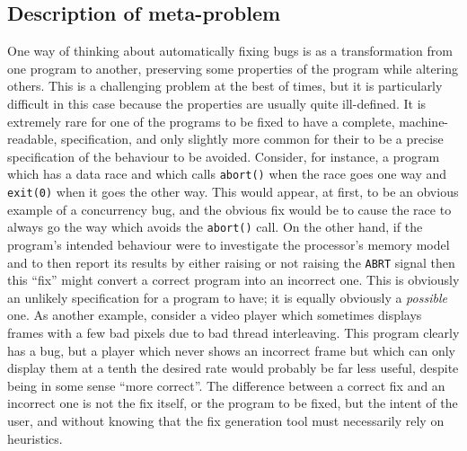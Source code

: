 \subsection{Description of meta-problem}


One way of thinking about automatically fixing bugs is as a
transformation from one program to another, preserving some properties
of the program while altering others.  This is a challenging problem
at the best of times, but it is particularly difficult in this case
because the properties are usually quite ill-defined.  It is extremely
rare for one of the programs to be fixed to have a complete,
machine-readable, specification, and only slightly more common for
their to be a precise specification of the behaviour to be avoided.
Consider, for instance, a program which has a data race and which
calls \texttt{abort()} when the race goes one way and \texttt{exit(0)}
when it goes the other way.  This would appear, at first, to be an
obvious example of a concurrency bug, and the obvious fix would be to
cause the race to always go the way which avoids the \texttt{abort()}
call.  On the other hand, if the program's intended behaviour were to
investigate the processor's memory model and to then report its
results by either raising or not raising the \texttt{ABRT} signal then
this ``fix'' might convert a correct program into an incorrect one.
This is obviously an unlikely specification for a program to have; it
is equally obviously a \emph{possible} one.  As another example,
consider a video player which sometimes displays frames with a few bad
pixels due to bad thread interleaving.  This program clearly has a
bug, but a player which never shows an incorrect frame but which can
only display them at a tenth the desired rate would probably be far
less useful, despite being in some sense ``more correct''.  The
difference between a correct fix and an incorrect one is not the fix
itself, or the program to be fixed, but the intent of the user, and
without knowing that the fix generation tool must necessarily rely on
heuristics.

